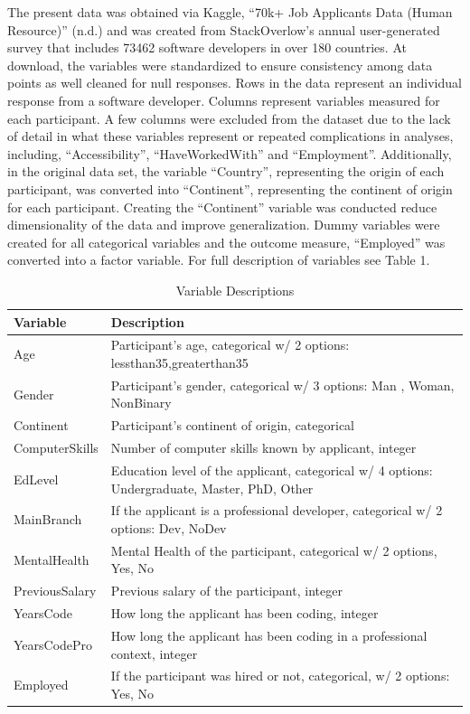 \documentclass[
  man]{apa6}
\begin{document}
The present data was obtained via Kaggle, {``70k+ Job Applicants Data (Human Resource)''} (n.d.) and was created from StackOverlow's annual user-generated survey that includes 73462 software developers in over 180 countries. At download, the variables were standardized to ensure consistency among data points as well cleaned for null responses. Rows in the data represent an individual response from a software developer. Columns represent variables measured for each participant. A few columns were excluded from the dataset due to the lack of detail in what these variables represent or repeated complications in analyses, including, ``Accessibility'', ``HaveWorkedWith'' and ``Employment''. Additionally, in the original data set, the variable ``Country'', representing the origin of each participant, was converted into ``Continent'', representing the continent of origin for each participant. Creating the ``Continent'' variable was conducted reduce dimensionality of the data and improve generalization. Dummy variables were created for all categorical variables and the outcome measure, ``Employed'' was converted into a factor variable. For full description of variables see Table 1.

\begin{table}

\caption{\label{tab:unnamed-chunk-1}Variable Descriptions}
\centering
\begin{tabular}[t]{>{}l>{\raggedright\arraybackslash}p{30em}}
\toprule
Variable & Description\\
\midrule
Age & Participant's age, categorical 
w/ 2 options: lessthan35,greaterthan35\\
Gender & Participant's gender, categorical 
w/ 3 options: Man , Woman, NonBinary\\
Continent & Participant's continent of origin, 
categorical\\
ComputerSkills & Number of computer skills known by 
applicant, integer\\
EdLevel & Education level of the applicant, 
categorical w/ 4 options: Undergraduate, Master, PhD, Other\\
\addlinespace
MainBranch & If the applicant is a professional 
developer, categorical w/ 2 options: Dev, NoDev\\
MentalHealth & Mental Health of the participant, 
categorical w/ 2 options, Yes, No\\
PreviousSalary & Previous salary of the participant, 
integer\\
YearsCode & How long the applicant has been coding, 
integer\\
YearsCodePro & How long the applicant has been coding in
 a professional context, integer\\
\addlinespace
Employed & If the participant was hired or not,  categorical, 
 w/ 2 options: Yes, No\\
\bottomrule
\end{tabular}
\end{table}
\end{document}
